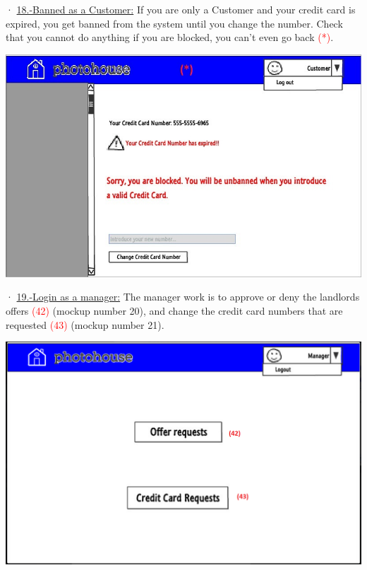 \documentclass[12pt]{article}
\begin{document}
{· \underline{18.-Banned as a Customer:} If you are only a Customer and your credit card is expired, you get banned from the system until you change the number. Check that you cannot do anything if you are blocked, you can't even go back \textcolor{red}{(*)}.
\begin{center}
	\includegraphics[scale=1.392]{customer_blocked.jpg}
\end{center}

\newpage
· \underline{19.-Login as a manager:} The manager work is to approve or deny the landlords offers \textcolor{red}{(42)} (mockup number 20), and change the credit card numbers that are requested \textcolor{red}{(43)} (mockup number 21).
\begin{center}
	\includegraphics[scale=.7]{manager.PNG}
\end{center}


}
\end{document}
